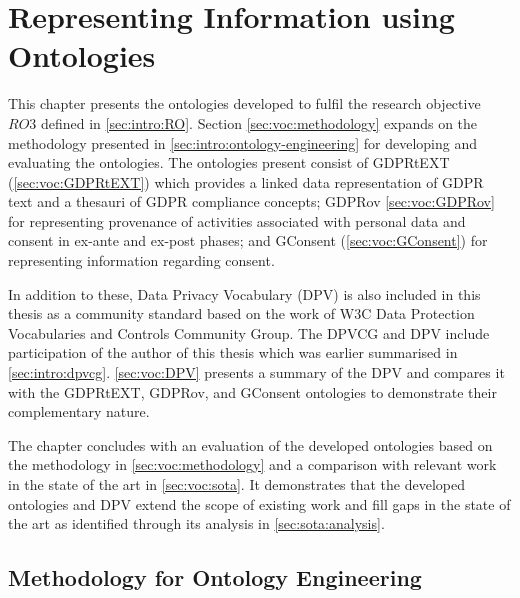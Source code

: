 \chapter{Representing Information using Ontologies}
\label{chapter:vocabularies}

This chapter presents the ontologies developed to fulfil the research objective $RO3$ defined in \autoref{sec:intro:RO}.
Section \autoref{sec:voc:methodology} expands on the methodology presented in \autoref{sec:intro:ontology-engineering} for developing and evaluating the ontologies.
The ontologies present consist of GDPRtEXT (\autoref{sec:voc:GDPRtEXT}) which provides a linked data representation of GDPR text and a thesauri of GDPR compliance concepts; GDPRov \autoref{sec:voc:GDPRov} for representing provenance of activities associated with personal data and consent in ex-ante and ex-post phases; and GConsent (\autoref{sec:voc:GConsent}) for representing information regarding consent.

In addition to these, Data Privacy Vocabulary (DPV) is also included in this thesis as a community standard based on the work of W3C Data Protection Vocabularies and Controls Community Group. The DPVCG and DPV include participation of the author of this thesis which was earlier summarised in \autoref{sec:intro:dpvcg}. \autoref{sec:voc:DPV} presents a summary of the DPV and compares it with the GDPRtEXT, GDPRov, and GConsent ontologies to demonstrate their complementary nature.

The chapter concludes with an evaluation of the developed ontologies based on the methodology in \autoref{sec:voc:methodology} and a comparison with relevant work in the state of the art in \autoref{sec:voc:sota}.
It demonstrates that the developed ontologies and DPV extend the scope of existing work and fill gaps in the state of the art as identified through its analysis in \autoref{sec:sota:analysis}.

\section{Methodology for Ontology Engineering}\label{sec:voc:methodology}

